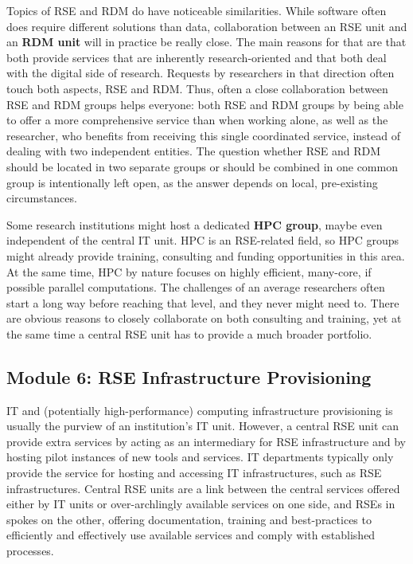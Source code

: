 \documentclass[a4paper]{article}
\begin{document}
Topics of RSE and RDM do have noticeable similarities.
While software often does require different solutions than data, collaboration between an RSE unit and an \textbf{RDM unit} will in practice be really close.
The main reasons for that are that both provide services that are inherently research-oriented and that both deal with the digital side of research.
Requests by researchers in that direction often touch both aspects, RSE and RDM\@.
Thus, often a close collaboration between RSE and RDM groups helps everyone: both RSE and RDM groups by being able to offer a more comprehensive service than when working alone, as well as the researcher, who benefits from receiving this single coordinated service, instead of dealing with two independent entities.
The question whether RSE and RDM should be located in two separate groups or should be combined in one common group is intentionally left open, as the answer depends on local, pre-existing circumstances.

Some research institutions might host a dedicated \textbf{HPC group}, maybe even independent of the central IT unit.
HPC is an RSE-related field, so HPC groups might already provide training, consulting and funding opportunities in this area.
At the same time, HPC by nature focuses on highly efficient, many-core, if possible parallel computations.
The challenges of an average researchers often start a long way before reaching that level, and they never might need to.
There are obvious reasons to closely collaborate on both consulting and training, yet at the same time a central RSE unit has to provide a much broader portfolio.

\subsection{Module 6: RSE Infrastructure Provisioning}%
\label{sec:infrastructure}

IT and (potentially high-performance) computing infrastructure provisioning is usually the purview of an institution's IT unit.
However, a central RSE unit can provide extra services by acting as an intermediary for RSE infrastructure and by hosting pilot instances of new tools and services.
IT departments typically only provide the service for hosting and accessing IT infrastructures, such as RSE infrastructures.
Central RSE units are a link between the central services offered either by IT units or over-archlingly available services on one side,
and RSEs in spokes on the other, offering documentation, training and best-practices to efficiently and effectively use available services and comply with established processes.
\end{document}
